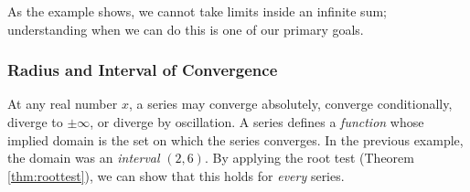 As the example shows, we cannot take limits inside an infinite sum; understanding when we can do this is one of our primary goals. 

\goodbreak



\subsubsection*{Radius and Interval of Convergence}

At any real number $x$, a series may converge absolutely, converge conditionally, diverge to $\pm\infty$, or diverge by oscillation. A series defines a \emph{function} whose implied domain is the set on which the series converges. In the previous example, the domain was an \emph{interval} $(2,6)$. By applying the root test (Theorem \ref{thm:roottest}), we can show that this holds for \emph{every} series.

